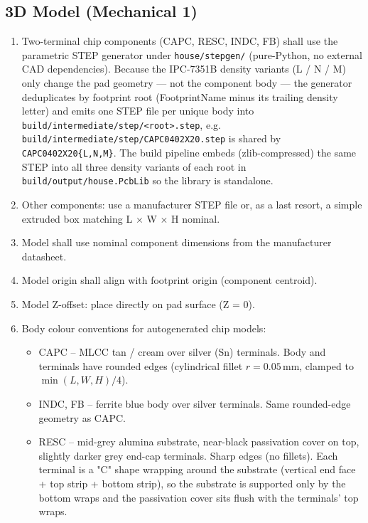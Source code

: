 \documentclass[11pt,a4paper]{article}
\begin{document}
\subsection{3D Model (Mechanical 1)}

\begin{enumerate}[nosep]
  \item Two-terminal chip components (CAPC, RESC, INDC, FB) shall use the parametric STEP generator under \texttt{house/stepgen/} (pure-Python, no external CAD dependencies). Because the IPC-7351B density variants (L / N / M) only change the pad geometry --- not the component body --- the generator deduplicates by footprint root (FootprintName minus its trailing density letter) and emits one STEP file per unique body into \texttt{build/intermediate/step/<root>.step}, e.g. \texttt{build/intermediate/step/CAPC0402X20.step} is shared by \texttt{CAPC0402X20\{L,N,M\}}. The build pipeline embeds (zlib-compressed) the same STEP into all three density variants of each root in \texttt{build/output/house.PcbLib} so the library is standalone.
  \item Other components: use a manufacturer STEP file or, as a last resort, a simple extruded box matching L $\times$ W $\times$ H nominal.
  \item Model shall use nominal component dimensions from the manufacturer datasheet.
  \item Model origin shall align with footprint origin (component centroid).
  \item Model Z-offset: place directly on pad surface (Z = 0).
  \item Body colour conventions for autogenerated chip models:
    \begin{itemize}[nosep]
      \item CAPC -- MLCC tan / cream over silver (Sn) terminals. Body and terminals have rounded edges (cylindrical fillet $r = 0.05$\,mm, clamped to $\min(L,W,H)/4$).
      \item INDC, FB -- ferrite blue body over silver terminals. Same rounded-edge geometry as CAPC.
      \item RESC -- mid-grey alumina substrate, near-black passivation cover on top, slightly darker grey end-cap terminals. Sharp edges (no fillets). Each terminal is a "C" shape wrapping around the substrate (vertical end face + top strip + bottom strip), so the substrate is supported only by the bottom wraps and the passivation cover sits flush with the terminals' top wraps.
    \end{itemize}
\end{enumerate}
\end{document}
